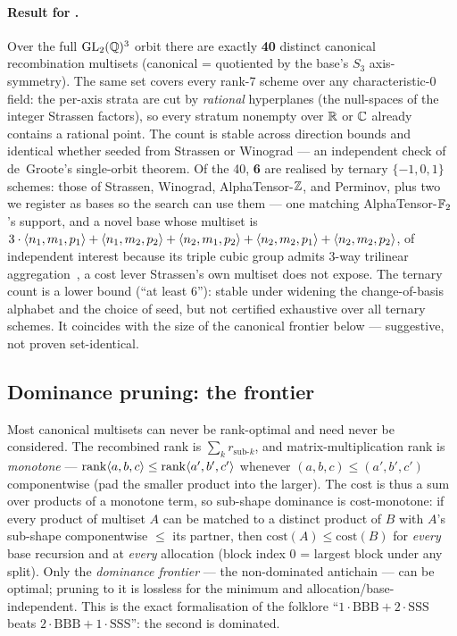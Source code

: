 \paragraph{Result for .} Over the full
\(\mathrm{GL}_2(\mathbb{Q})^3\) orbit there are exactly \textbf{40} distinct
canonical recombination multisets (canonical = quotiented by the base's
\(S_3\) axis-symmetry). The same set covers every rank-7 scheme over any
characteristic-0 field: the per-axis strata are cut by \emph{rational}
hyperplanes (the null-spaces of the integer Strassen factors), so every
stratum nonempty over \(\mathbb{R}\) or \(\mathbb{C}\) already contains a rational
point. The count is stable across direction bounds and identical whether
seeded from Strassen or Winograd --- an independent check of de~Groote's
single-orbit theorem. Of the 40, \textbf{6} are realised by ternary
\(\{-1,0,1\}\) schemes: those of Strassen, Winograd,
AlphaTensor-\(\mathbb{Z}\), and Perminov, plus two we register as bases so
the search can use them --- one matching AlphaTensor-\(\mathbb{F}_2\)'s support,
and a novel base whose multiset is
\(3\cdot\langle n_1, m_1, p_1 \rangle+\langle n_1, m_2, p_2 \rangle+\langle n_2, m_1, p_2 \rangle+\langle n_2, m_2, p_1 \rangle+\langle n_2, m_2, p_2 \rangle\),
of independent interest because its triple cubic group admits 3-way
trilinear aggregation~\cite{pan1978}, a cost lever Strassen's own multiset
does not expose. The ternary count is a lower bound (``at least 6''):
stable under widening the change-of-basis alphabet and the choice of seed,
but not certified exhaustive over all ternary schemes. It coincides with
the size of the canonical frontier below --- suggestive, not proven
set-identical.

\subsection{Dominance pruning: the frontier}\label{ssec:frontier}

Most canonical multisets can never be rank-optimal and need never be considered.
The recombined rank is \(\sum_k r_{\text{sub-}k}\), and matrix-multiplication rank
is \emph{monotone} --- \(\operatorname{rank}\langle a, b, c \rangle\le\operatorname{rank}\langle a', b', c' \rangle\)
whenever \((a,b,c)\le(a',b',c')\) componentwise (pad the smaller product into the
larger). The cost is thus a sum over products of a monotone term, so sub-shape
dominance is cost-monotone: if every product of multiset \(A\) can be matched to a
distinct product of \(B\) with \(A\)'s sub-shape componentwise \(\le\) its partner,
then \(\mathrm{cost}(A)\le\mathrm{cost}(B)\) for \emph{every} base recursion and at
\emph{every} allocation (block index \(0\) = largest block under any split). Only the
\emph{dominance frontier} --- the non-dominated antichain --- can be optimal; pruning
to it is lossless for the minimum and allocation/base-independent. This is the exact
formalisation of the folklore ``\(1\cdot\mathrm{BBB}+2\cdot\mathrm{SSS}\) beats
\(2\cdot\mathrm{BBB}+1\cdot\mathrm{SSS}\)'': the second is dominated.

